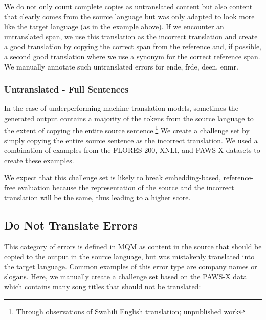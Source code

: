 \documentclass[11pt]{article}
\begin{document}
We do not only count complete copies as untranslated content but also content that clearly comes from the source language but was only adapted to look more like the target language (as in the example above). If we encounter an untranslated span, we use this translation as the incorrect translation and create a good translation by copying the correct span from the reference and, if possible, a second good translation where we use a synonym for the correct reference span. We manually annotate such untranslated errors for ende, frde, deen, enmr.

\subsubsection{Untranslated - Full Sentences}
\label{subsec:sent-untranslated}
In the case of underperforming machine translation models, sometimes the generated output contains a majority of the tokens from the source language to the extent of copying the entire source sentence.\footnote{Through observations of Swahili  English translation; unpublished work} We create a challenge set by simply copying the entire source sentence as the incorrect translation. We used a combination of examples from the FLORES-200, XNLI, and PAWS-X datasets to create these examples. 

We expect that this challenge set is likely to break embedding-based, reference-free evaluation because the representation of the source and the incorrect translation will be the same, thus leading to a higher score. 


\subsection{Do Not Translate Errors}
\label{sec:do-not-translate}
This category of errors is defined in MQM as content in the source that should be copied to the output in the source language, but was mistakenly translated into the target language. Common examples of this error type are company names or slogans. Here, we manually create a challenge set based on the PAWS-X data which contains many song titles that should not be translated:
\end{document}
